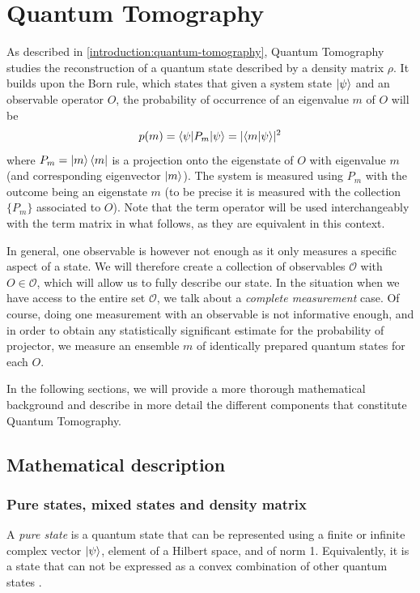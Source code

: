 \documentclass[12pt]{memoir}
\newcommand{\ti}{\textit}
\begin{document}
\section{Quantum Tomography}\label{section:quantum-tomography}
As described in \ref{introduction:quantum-tomography}, Quantum Tomography studies the reconstruction of a quantum state described by a density matrix $\rho$. It builds upon the Born rule, which states that given a system state $\ket \psi$ and an observable operator $O$, the probability of occurrence of an eigenvalue $m$ of $O$ will be 
\begin{equation}
    p(m) = \braket{\psi | P_m| \psi} = \lvert\braket{m|\psi}\rvert^2
\end{equation}
where $P_m = \ket m \bra m$ is a projection onto the eigenstate of $O$ with eigenvalue $m$ (and corresponding eigenvector $\ket m$). The system is measured using $P_m$ with the outcome being an eigenstate $m$ (to be precise it is measured with the collection $\{P_m\}$ associated to $O$). Note that the term operator will be used interchangeably with the term matrix in what follows, as they are equivalent in this context.\medbreak

In general, one observable is however not enough as it only measures a specific aspect of a state. We will therefore create a collection of observables $\mathcal{O}$ with $O \in \mathcal{O}$, which will allow us to fully describe our state. In the situation when we have access to the entire set $\mathcal{O}$, we talk about a \ti{complete measurement} case. Of course, doing one measurement with an observable is not informative enough, and in order to obtain any statistically significant estimate for the probability of projector, we measure an ensemble $m$ of identically prepared quantum states for each $O$. \medbreak

In the following sections, we will provide a more thorough mathematical background and describe in more detail the different components that constitute Quantum Tomography.
\subsection{Mathematical description} \label{background:Quantum Tomography:math}

\subsubsection*{Pure states, mixed states and density matrix}
A \textit{pure state} is a quantum state that can be represented using a finite or infinite complex vector $\ket \psi$, element of a Hilbert space, and of norm 1. Equivalently, it is a state that can not be expressed as a convex combination of other quantum states \cite{wiki:density-matrix}.\medbreak
\end{document}
